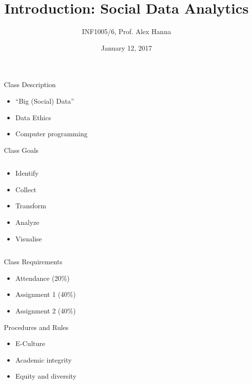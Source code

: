 \documentclass{beamer}
\title[Introduction: Social Data Analytics]
{Introduction: Social Data Analytics}
\author{INF1005/6, Prof. Alex Hanna}
\institute[] {
}
\date[] {
January 12, 2017
}
\begin{document}
\begin{frame}
  \titlepage
\end{frame}

\begin{frame}{Class Description}
    \begin{itemize}
        \item ``Big (Social) Data''
        \item Data Ethics
        \item Computer programming
    \end{itemize}
\end{frame}

\begin{frame}{Class Goals}
  \begin{columns}
    \begin{column}{0.5\textwidth}
      \begin{itemize}[<+->]
        \item Identify
        \item Collect
        \item Transform
        \item Analyze
        \item Visualise
      \end{itemize}
    \end{column}
    \begin{column}{0.5\textwidth}
    \end{column}
  \end{columns}
\end{frame}

\begin{frame}{Class Requirements}
  \begin{center}
      \begin{itemize}[<+->]
        \item Attendance (20\%)
        \item Assignment 1 (40\%)
        \item Assignment 2 (40\%)
      \end{itemize}
  \end{center}
\end{frame}

\begin{frame}{Procedures and Rules}
    \begin{itemize}[<+->]
        \item E-Culture 
        \item Academic integrity
        \item Equity and diversity
    \end{itemize}
\end{frame}
\end{document}
